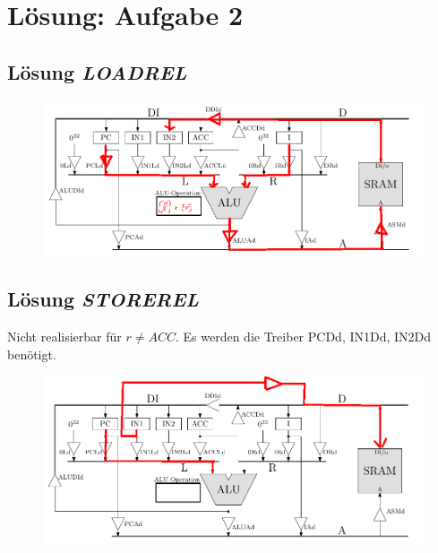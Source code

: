 \documentclass{scrartcl}[9pt, a4paper]
\begin{document}
\section*{Lösung: Aufgabe 2}

\subsection*{Lösung \emph{LOADREL}}

\begin{figure}[h]
	\centering
	\includegraphics[width=.8\textwidth]{figs/retil1}
\end{figure}


\subsection*{Lösung \emph{STOREREL}}

Nicht realisierbar für $r \neq ACC$. Es werden die Treiber PCDd, IN1Dd, IN2Dd benötigt.

\begin{figure}[h]
	\centering
	\includegraphics[width=.8\textwidth]{figs/reti}
\end{figure}
\end{document}
